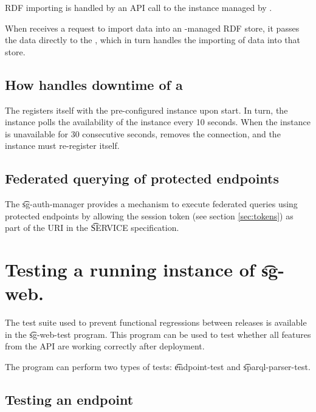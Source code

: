   RDF importing is handled by an API call to the instance managed by
  .

  When  receives a request to import data into an
  -managed RDF store, it passes the data directly
  to the , which in turn handles the importing of data
  into that store.

\subsection{How  handles downtime of a }

  The  registers itself with the pre-configured
   instance upon start.  In turn, the  instance
  polls the availability of the  instance every 10
  seconds.  When the  instance is unavailable for 30
  consecutive seconds,  removes the connection, and the
   instance must re-register itself.

\subsection{Federated querying of protected endpoints}

  The \t{sg-auth-manager} provides a mechanism to execute federated queries
  using protected endpoints by allowing the session token (see section
  \ref{sec:tokens}) as part of the URI in the \t{SERVICE} specification.

\pagebreak{}
\section{Testing a running instance of \t{sg-web}.}

  The test suite used to prevent functional regressions between releases is
  available in the \t{sg-web-test} program.  This program can be used to test
  whether all features from the API are working correctly after deployment.

  The program can perform two types of tests: \t{endpoint-test} and
  \t{sparql-parser-test}.

\subsection{Testing an endpoint}

